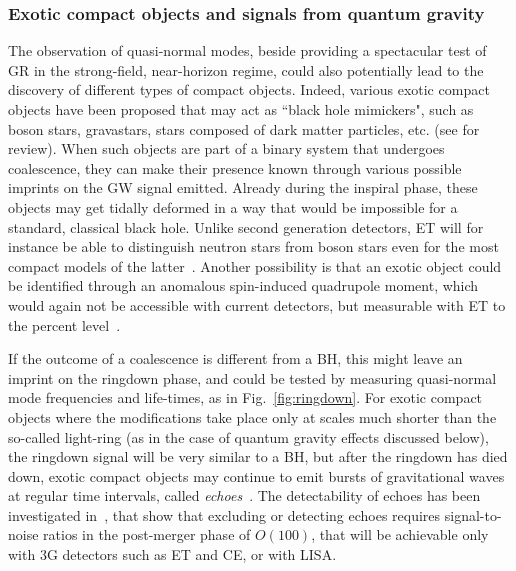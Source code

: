  

\subsubsection{Exotic compact objects and signals from quantum gravity}

The observation of quasi-normal modes, beside providing a spectacular test of GR in the strong-field, near-horizon regime, could also potentially lead to the discovery of different types of compact objects.
Indeed, various exotic compact objects have been proposed that may act as ``black hole mimickers",
such as boson stars, gravastars, stars composed of dark matter particles, etc.
(see \cite{Cardoso:2019rvt} for review). When such  objects are part of a binary system that undergoes
coalescence, they can make their presence known through various possible imprints on 
the GW signal emitted. Already during the inspiral phase, these objects may get tidally deformed in a way that would be impossible 
for a standard, classical black hole. Unlike second generation detectors, ET will for instance be able to distinguish neutron stars from boson stars even for the most compact models of the latter~\cite{Cardoso:2017cfl}.  
Another possibility is that an exotic object could be identified through 
an anomalous spin-induced quadrupole moment, which would again not be accessible with 
current detectors, but measurable with ET to the percent level~\cite{Krishnendu:2017shb}.

If the outcome of a coalescence is different from a BH, this might leave an imprint on  the  ringdown phase, and could be tested by measuring quasi-normal mode frequencies and life-times, as in Fig.~\ref{fig:ringdown}. For exotic compact objects where the modifications take place only at  scales much shorter than the so-called light-ring (as in the case of quantum gravity effects discussed below), the ringdown signal will be very similar to a BH, but after the ringdown has died down, exotic compact objects may continue to 
emit bursts of gravitational waves at regular time intervals, called \emph{echoes}~\cite{Cardoso:2016rao,Cardoso:2017cqb}. The detectability of echoes  has been investigated in~\cite{Maggio:2019zyv,Testa:2018bzd}, that show that excluding or detecting echoes   requires signal-to-noise ratios in the post-merger phase of $O(100)$, that  will be achievable only with 3G detectors such as ET and CE, or with LISA.


